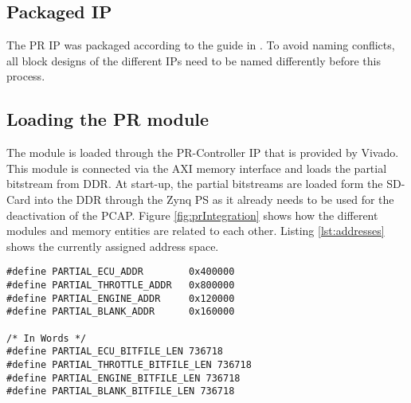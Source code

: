 \subsection{Packaged IP}
The \gls{PR} IP was packaged according to the guide in \cite{xilinx_ug1118-vivado-creating-packaging-custom-ip.pdf_nodate}.
To avoid naming conflicts, all block designs of the different IPs need to be named differently before this process.
\subsection{Loading the \gls{PR} module}
The module is loaded through the \gls{PR}-Controller IP that is provided by Vivado. 
This module is connected via the AXI memory interface and loads the partial bitstream from DDR.
At start-up, the partial bitstreams are loaded form the SD-Card into the DDR through the Zynq \gls{PS} as it already needs to be used for the deactivation of the \gls{PCAP}.
Figure \ref{fig:prIntegration} shows how the different modules and memory entities are related to each other.
Listing \ref{lst:addresses} shows the currently assigned address space.

\lstset{language=c}
\begin{lstlisting}[caption={Address and Length of the partial bitstreams in DDR memory.},
    label=lst:addresses]
#define PARTIAL_ECU_ADDR   		0x400000
#define PARTIAL_THROTTLE_ADDR   0x800000
#define PARTIAL_ENGINE_ADDR   	0x120000
#define PARTIAL_BLANK_ADDR   	0x160000

/* In Words */
#define PARTIAL_ECU_BITFILE_LEN 736718
#define PARTIAL_THROTTLE_BITFILE_LEN 736718
#define PARTIAL_ENGINE_BITFILE_LEN 736718
#define PARTIAL_BLANK_BITFILE_LEN 736718
\end{lstlisting}